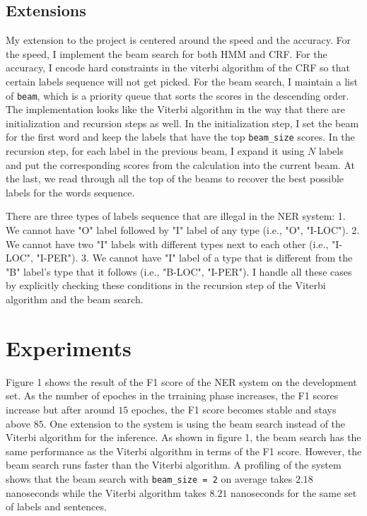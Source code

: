 \documentclass[11pt,a4paper]{article}
\begin{document}
\subsection{Extensions}

My extension to the project is centered around the speed and the accuracy. 
For the speed, I implement the beam search for both HMM and CRF. 
For the accuracy, I encode hard constraints in the viterbi algorithm of the CRF
so that certain labels sequence will not get picked.
For the beam search, I maintain a list of \verb|beam|, which is a priority queue
that sorts the scores in the descending order. The implementation looks like
the Viterbi algorithm in the way that there are initialization and recursion steps as well. 
In the initialization
step, I set the beam for the first word and keep the labels that have the top \verb|beam_size|
scores. In the recursion step, for each label in the previous beam, I expand it
using $N$ labels and put the corresponding scores from the calculation 
into the current beam. At the last, we read through all the top of the beams to recover 
the best possible labels for the words sequence.

There are three types of labels sequence that are illegal in the NER system: 
1. We cannot have "O" label followed
by "I" label of any type (i.e., "O", "I-LOC"). 2. We cannot have two "I" labels with different
types next to each other (i.e., "I-LOC", "I-PER"). 3. We cannot have "I" label of a type that
is different from the "B" label's type that it follows (i.e., "B-LOC", "I-PER"). I handle all these
cases by explicitly checking these conditions in the recursion step of the Viterbi algorithm and
the beam search.

\section{Experiments}

Figure 1 shows the result of the F1 score of the NER system on the development set.
As the number of epoches in the trraining phase increases, the F1 scores increase 
but after around $15$ epoches, the F1 score becomes stable and stays above $85$. One extension to the system
is using the beam search instead of the Viterbi algorithm for the inference.
As shown in figure 1, the beam search has the same performance as the Viterbi algorithm
in terms of the F1 score. However, the beam search runs faster than the Viterbi algorithm.
A profiling of the system shows that 
the beam search with \verb|beam_size = 2| on average takes $2.18$ nanoseconds 
while the Viterbi algorithm takes $8.21$ nanoseconds for the same set of labels 
and sentences. 
\end{document}
